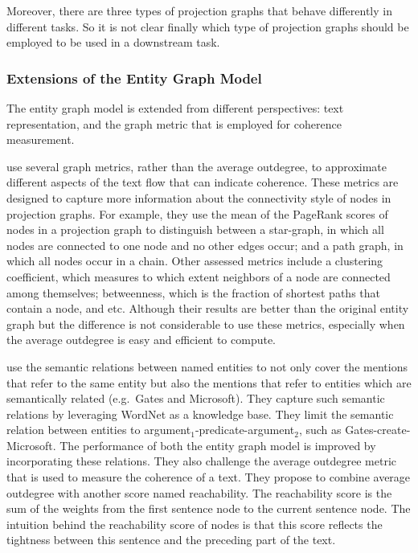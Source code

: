 Moreover, there are three types of projection graphs that behave differently in different tasks. 
So it is not clear finally which type of projection graphs should be employed to be used in a downstream task. 

\subsubsection{Extensions of the Entity Graph Model}

The entity graph model is extended from different perspectives: text representation, and the graph metric that is employed for coherence measurement. 

 use several graph metrics, rather than the average outdegree, to approximate different aspects of the text flow that can indicate coherence.  
These metrics are designed to capture more information about the connectivity style of nodes in projection graphs. 
For example, they use the mean of the PageRank scores \cite{newmanmark10}  of nodes in a projection graph to distinguish between a star-graph, in which all nodes are connected to one node and no other edges occur; and a path graph, in which all nodes occur in a chain. 
Other assessed metrics include a clustering coefficient, which measures to which extent neighbors of a node are connected among themselves; betweenness, which is the fraction of shortest paths that contain a node, and etc. 
Although their results are better than the original entity graph but the difference is not considerable to use these metrics, especially when the average outdegree is easy and efficient to compute. 

 use the semantic relations between named entities to not only cover 
the mentions that refer to the same entity but also the mentions that refer to entities which are semantically related (e.g.\ Gates and Microsoft). 
They capture such semantic relations by leveraging WordNet \cite{baccianella10} as a knowledge base. 
They limit the semantic relation between entities to argument$_1$-predicate-argument$_2$, such as Gates-create-Microsoft. 
The performance of both the entity graph model is improved by incorporating these relations. 
They also challenge the average outdegree metric that is used to measure the coherence of a text. 
They propose to combine average outdegree with another score named reachability. 
The reachability score is the sum of the weights from the first sentence node to the current sentence node. 
The intuition behind the reachability score of nodes is that this score reflects the tightness between this sentence and the preceding part of the text. 


